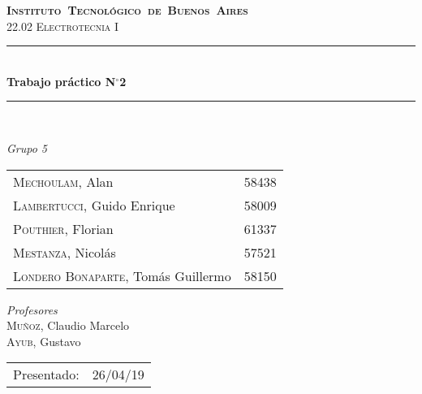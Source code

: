 \begin{titlepage}
\newcommand{\HRule}{\rule{\linewidth}{0.5mm}}
\center
\mbox{\textsc{\LARGE \bfseries {Instituto Tecnológico de Buenos Aires}}}\\[1.5cm]
\textsc{\Large 22.02 Electrotecnia I}\\[0.5cm]


\HRule \\[0.6cm]
{ \Huge \bfseries Trabajo práctico N$^{\circ}$2}\\[0.4cm] 
\HRule \\[1.5cm]


{\large

\emph{Grupo 5}\\
\vspace{3px}

\begin{tabular}{lr} 	
\textsc{Mechoulam}, Alan  &  58438\\
\textsc{Lambertucci}, Guido Enrique  & 58009 \\
\textsc{Pouthier}, Florian  & 61337 \\
\textsc{Mestanza}, Nicolás  & 57521 \\
\textsc{Londero Bonaparte}, Tomás Guillermo  & 58150 \\
\end{tabular}

\vspace{20px}

\emph{Profesores}\\
\vspace{3px}
\textsc{Muñoz}, Claudio Marcelo\\ 	
\textsc{Ayub}, Gustavo\\ 	

\vspace{100px}

\begin{tabular}{ll}

Presentado: & 26/04/19\\

\end{tabular}

}

\vfill

\end{titlepage}
